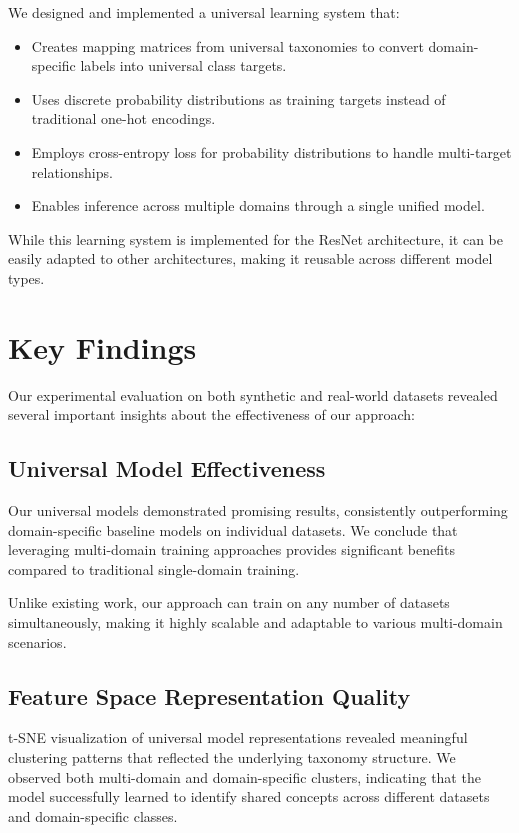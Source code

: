 We designed and implemented a universal learning system that:

\begin{itemize}
      \item Creates mapping matrices from universal taxonomies to convert domain-specific labels
            into universal class targets.
      \item Uses discrete probability distributions as training targets
            instead of traditional one-hot encodings.
      \item Employs cross-entropy loss for probability distributions
            to handle multi-target relationships.
      \item Enables inference across multiple domains through a single unified model.
\end{itemize}

While this learning system is implemented for the ResNet architecture,
it can be easily adapted to other architectures,
making it reusable across different model types.

\section{Key Findings}

Our experimental evaluation on both synthetic and real-world datasets
revealed several important insights about the effectiveness of our approach:

\subsection{Universal Model Effectiveness}

Our universal models demonstrated promising results,
consistently outperforming domain-specific baseline models on individual datasets.
We conclude that leveraging multi-domain training approaches
provides significant benefits compared to traditional single-domain training.

Unlike existing work,
our approach can train on any number of datasets simultaneously,
making it highly scalable and adaptable to various multi-domain scenarios.

\subsection{Feature Space Representation Quality}

t-SNE visualization of universal model representations revealed
meaningful clustering patterns that reflected the underlying taxonomy structure.
We observed both multi-domain and domain-specific clusters,
indicating that the model successfully learned to identify shared concepts
across different datasets and domain-specific classes.

